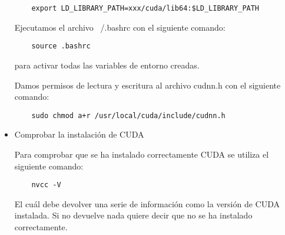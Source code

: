 \begin{itemize}
    \begin{lstlisting}
    export LD_LIBRARY_PATH=xxx/cuda/lib64:$LD_LIBRARY_PATH
    \end{lstlisting}
    
    Ejecutamos el archivo ~/.bashrc con el siguiente comando:
    
    \begin{lstlisting}
    source .bashrc
    \end{lstlisting}
    
    para activar todas las variables de entorno creadas.
    
    Damos permisos de lectura y escritura al archivo cudnn.h con el siguiente comando:
    
    \begin{lstlisting}
    sudo chmod a+r /usr/local/cuda/include/cudnn.h
    \end{lstlisting}
    
    \item Comprobar la instalación de CUDA
    
    Para comprobar que se ha instalado correctamente CUDA se utiliza el siguiente comando:
    
    \begin{lstlisting}
    nvcc -V
    \end{lstlisting}
    
    El cuál debe devolver una serie de información como la versión de CUDA instalada. Si no devuelve nada quiere decir que no se ha instalado correctamente.
\end{itemize}